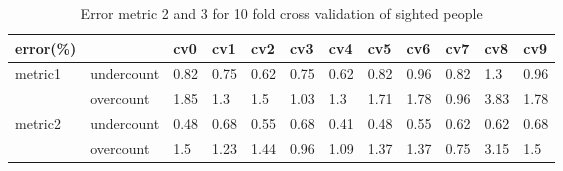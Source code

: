 \documentclass[11pt]{article}
\begin{document}
{\begin{table}[]
\centering
\caption{Error metric 2 and 3 for 10 fold cross validation of sighted people}
\label{label_metric23_sighted}
\begin{tabular}{llllllllllll}
\hline
error(\%)                &            & cv0   & cv1   & cv2   & cv3   & cv4   & cv5   & cv6   & cv7   & cv8   & cv9  \\ \hline
metric1                  & undercount & 0.82  & 0.75  & 0.62  & 0.75  & 0.62  & 0.82  & 0.96  & 0.82  & 1.3   & 0.96 \\
                         & overcount  & 1.85  & 1.3   & 1.5   & 1.03  & 1.3   & 1.71  & 1.78  & 0.96  & 3.83  & 1.78 \\ \hline
\multirow{2}{*}{metric2} & undercount & 0.48  & 0.68  & 0.55  & 0.68  & 0.41  & 0.48  & 0.55  & 0.62  & 0.62  & 0.68 \\
                         & overcount  & 1.5   & 1.23  & 1.44  & 0.96  & 1.09  & 1.37  & 1.37  & 0.75  & 3.15  & 1.5  \\ \hline
\end{tabular}
\end{table}


}
\end{document}
